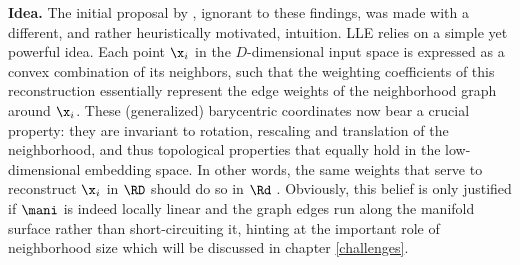 \textbf{Idea.}
The initial proposal by \citet{roweissaul2000}, ignorant to these findings, 
was made with a different, and rather heuristically motivated, intuition.
LLE relies on a simple yet powerful idea.
Each point $\x_i$ in the $D$-dimensional input space is expressed as a convex 
combination of its neighbors, such that the weighting coefficients of this 
reconstruction essentially represent the edge weights of the neighborhood graph 
around $\x_i$. 
These (generalized) barycentric coordinates now bear a crucial property: they 
are invariant to rotation, rescaling and translation of the neighborhood, and 
thus topological properties that equally hold in the low-dimensional embedding 
space. 
In other words, the same weights that serve to reconstruct $\x_i$ in $\RD$ 
should do so in $\Rd$ \citep{roweissaul2000}.
Obviously, this belief is only justified if $\mani$ is indeed locally linear and 
the graph edges run along the manifold surface rather than short-circuiting it, 
hinting at the important role of neighborhood size which will be discussed 
in chapter \ref{challenges}.

